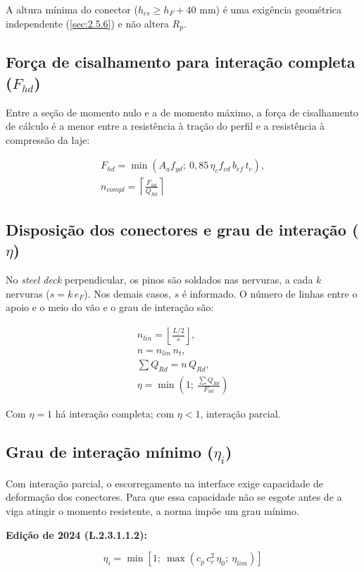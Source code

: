 A altura mínima do conector ($h_{cs} \ge h_F + 40$ mm) é uma exigência geométrica independente (\ref{sec:2.5.6}) e não altera $R_p$.

\subsection{Força de cisalhamento para interação completa ($F_{hd}$)}\label{sec:2.5.3}
Entre a seção de momento nulo e a de momento máximo, a força de cisalhamento de cálculo é a menor entre a resistência à tração do perfil e a resistência à compressão da laje:

\begin{gather*}
  F_{hd} = \min\left( A_a f_{yd};\ 0{,}85\,\eta_c f_{cd}\, b_{ef}\, t_c \right), \\
  n_{compl} = \left\lceil \frac{F_{hd}}{Q_{Rd}} \right\rceil
\end{gather*}

\subsection{Disposição dos conectores e grau de interação ($\eta$)}\label{sec:2.5.4}
No \emph{steel deck} perpendicular, os pinos são soldados nas nervuras, a cada $k$ nervuras ($s = k\, e_F$). Nos demais casos, $s$ é informado. O número de linhas entre o apoio e o meio do vão e o grau de interação são:

\begin{gather*}
  n_{lin} = \left\lfloor \frac{L/2}{s} \right\rfloor, \\
  n = n_{lin}\, n_t, \\
  \sum Q_{Rd} = n\, Q_{Rd}, \\
  \eta = \min\left(1;\ \frac{\sum Q_{Rd}}{F_{hd}}\right)
\end{gather*}

Com $\eta = 1$ há interação completa; com $\eta < 1$, interação parcial.

\subsection{Grau de interação mínimo ($\eta_i$)}\label{sec:2.5.5}
Com interação parcial, o escorregamento na interface exige capacidade de deformação dos conectores. Para que essa capacidade não se esgote antes de a viga atingir o momento resistente, a norma impõe um grau mínimo.

\textbf{Edição de 2024 (L.2.3.1.1.2):}

\[
  \eta_i = \min\left[ 1;\ \max\left( c_p\, c_r^2\, \eta_0;\ \eta_{lim} \right) \right]
\]

